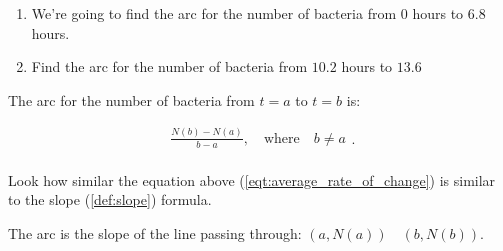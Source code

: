 \begin{enumerate}
  \label{item:what_we_are_going_to_do}

  \item We're going to find the \gls{arc} for the number of bacteria from
    $0$ hours to $6.8$ hours.
  \item Find the \gls{arc} for the number of bacteria from $10.2$ 
    hours to $13.6$
\end{enumerate}

The \gls{arc} for the number of bacteria from $t = a$ to $t = b$
is:

\begin{equation}
  \label{eqt:average_rate_of_change}
  \begin{split}
    \frac{N(b) - N(a)}{b - a}, \quad \textrm{where} \quad b \ne a \\
  \end{split}
.\end{equation}

\begin{note}
  \label{nte:average_rate_of_change_note}

  Look how similar the equation above (\ref{eqt:average_rate_of_change}) is
  similar to the slope (\ref{def:slope}) formula.
\end{note}

The \gls{arc} is the slope of the line passing through:
$(a, N(a)) \quad (b, N(b))$.

